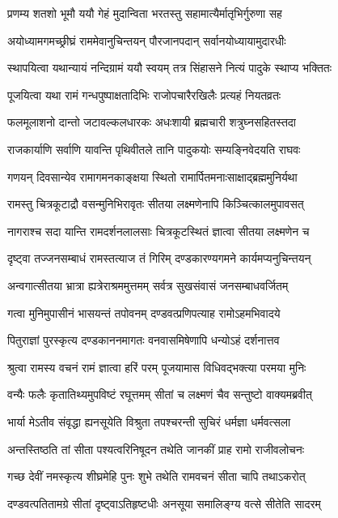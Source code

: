 \twolineshloka
{प्रणम्य शतशो भूमौ ययौ गेहं मुदान्विता}
{भरतस्तु सहामात्यैर्मातृभिर्गुरुणा सह} %

\twolineshloka
{अयोध्यामगमच्छ्रीघ्रं राममेवानुचिन्तयन्}
{पौरजानपदान् सर्वानयोध्यायामुदारधीः} %

\twolineshloka
{स्थापयित्वा यथान्यायं नन्दिग्रामं ययौ स्वयम्}
{तत्र सिंहासने नित्यं पादुके स्थाप्य भक्तितः} %

\twolineshloka
{पूजयित्वा यथा रामं गन्धपुष्पाक्षतादिभिः}
{राजोपचारैरखिलैः प्रत्यहं नियतव्रतः} %

\twolineshloka
{फलमूलाशनो दान्तो जटावल्कलधारकः}
{अधःशायी ब्रह्मचारी शत्रुघ्नसहितस्तदा} %

\twolineshloka
{राजकार्याणि सर्वाणि यावन्ति पृथिवीतले}
{तानि पादुकयोः सम्यङ्निवेदयति राघवः} %

\twolineshloka
{गणयन् दिवसान्येव रामागमनकाङ्क्षया}
{स्थितो रामार्पितमनाःसाक्षाद्ब्रह्ममुनिर्यथा} %

\twolineshloka
{रामस्तु चित्रकूटाद्रौ वसन्मुनिभिरावृतः}
{सीतया लक्ष्मणेनापि किञ्चित्कालमुपावसत्} %

\twolineshloka
{नागराश्च सदा यान्ति रामदर्शनलालसाः}
{चित्रकूटस्थितं ज्ञात्वा सीतया लक्ष्मणेन च} %

\twolineshloka
{दृष्ट्वा तज्जनसम्बाधं रामस्तत्याज तं गिरिम्}
{दण्डकारण्यगमने कार्यमप्यनुचिन्तयन्} %

\twolineshloka
{अन्वगात्सीतया भ्रात्रा ह्यत्रेराश्रममुत्तमम्}
{सर्वत्र सुखसंवासं जनसम्बाधवर्जितम्} %

\twolineshloka
{गत्वा मुनिमुपासीनं भासयन्तं तपोवनम्}
{दण्डवत्प्रणिपत्याह रामोऽहमभिवादये} %

\twolineshloka
{पितुराज्ञां पुरस्कृत्य दण्डकाननमागतः}
{वनवासमिषेणापि धन्योऽहं दर्शनात्तव} %

\twolineshloka
{श्रुत्वा रामस्य वचनं रामं ज्ञात्वा हरिं परम्}
{पूजयामास विधिवद्भक्त्या परमया मुनिः} %

\twolineshloka
{वन्यैः फलैः कृतातिथ्यमुपविष्टं रघूत्तमम्}
{सीतां च लक्ष्मणं चैव सन्तुष्टो वाक्यमब्रवीत्} %

\twolineshloka
{भार्या मेऽतीव संवृद्धा ह्यनसूयेति विश्रुता}
{तपश्चरन्ती सुचिरं धर्मज्ञा धर्मवत्सला} %

\twolineshloka
{अन्तस्तिष्ठति तां सीता पश्यत्वरिनिषूदन}
{तथेति जानकीं प्राह रामो राजीवलोचनः} %

\twolineshloka
{गच्छ देवीं नमस्कृत्य शीघ्रमेहि पुनः शुभे}
{तथेति रामवचनं सीता चापि तथाऽकरोत्} %

\twolineshloka
{दण्डवत्पतितामग्रे सीतां दृष्ट्वाऽतिहृष्टधीः}
{अनसूया समालिङ्ग्य वत्से सीतेति सादरम्} %

